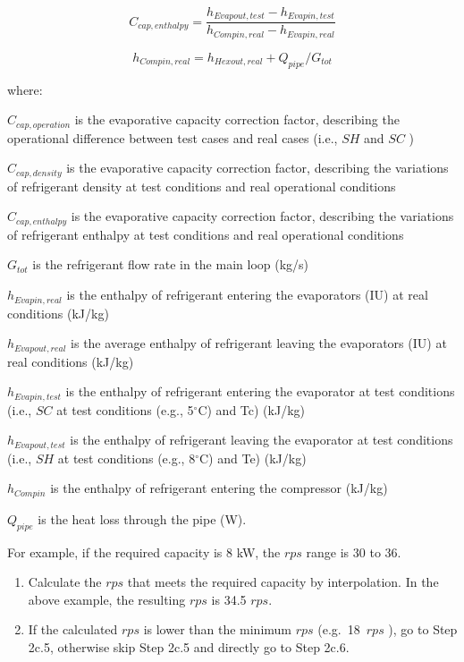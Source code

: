 \begin{equation}
C_{cap,enthalpy} = \frac{h_{Evapout,test}-h_{Evapin,test}}{h_{Compin,real}-h_{Evapin,real}}
\end{equation}

\begin{equation}
h_{Compin,real} = h_{Hexout,real}+Q_{pipe}/G_{tot}
\end{equation}

where:

\(C_{cap,operation}\) is the evaporative capacity correction factor, describing the operational difference between test cases and real cases (i.e., \(SH\) and \(SC\) )

\(C_{cap,density}\) is the evaporative capacity correction factor, describing the variations of refrigerant density at test conditions and real operational conditions

\(C_{cap,enthalpy}\) is the evaporative capacity correction factor, describing the variations of refrigerant enthalpy at test conditions and real operational conditions

\(G_{tot}\) is the refrigerant flow rate in the main loop (kg/s)

\(h_{Evapin,real}\) is the enthalpy of refrigerant entering the evaporators (IU) at real conditions (kJ/kg)

\(h_{Evapout,real}\) is the average enthalpy of refrigerant leaving the evaporators (IU) at real conditions (kJ/kg)

\(h_{Evapin,test}\) is the enthalpy of refrigerant entering the evaporator at test conditions (i.e., \(SC\) at test conditions (e.g., 5\(^{\circ}\)C) and Tc) (kJ/kg)

\(h_{Evapout,test}\) is the enthalpy of refrigerant leaving the evaporator at test conditions (i.e., \(SH\) at test conditions (e.g., 8\(^{\circ}\)C) and Te) (kJ/kg)

\(h_{Compin}\) is the enthalpy of refrigerant entering the compressor (kJ/kg)

\(Q_{pipe}\) is the heat loss through the pipe (W).

For example, if the required capacity is 8 kW, the \(rps\) range is 30 to 36.

\begin{enumerate}
\def\labelenumi{\alph{enumi}.}
\setcounter{enumi}{2}
\item
  Calculate the \(rps\) that meets the required capacity by interpolation. In the above example, the resulting \(rps\) is 34.5 \(rps\).
\item
  If the calculated \(rps\) is lower than the minimum \(rps\) (e.g.~18~\(rps\) ), go to Step 2c.5, otherwise skip Step 2c.5 and directly go to Step 2c.6.
\end{enumerate}

